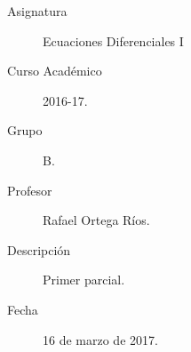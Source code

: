 \documentclass[12pt]{article}
\begin{document}

    
    

    \begin{description}
        \item[Asignatura] Ecuaciones Diferenciales I
        \item[Curso Académico] 2016-17.
        \item[Grupo] B.
        \item[Profesor] Rafael Ortega Ríos.
        \item[Descripción] Primer parcial.
        \item[Fecha] 16 de marzo de 2017.
    
    \end{description}
    \newpage
\end{document}

